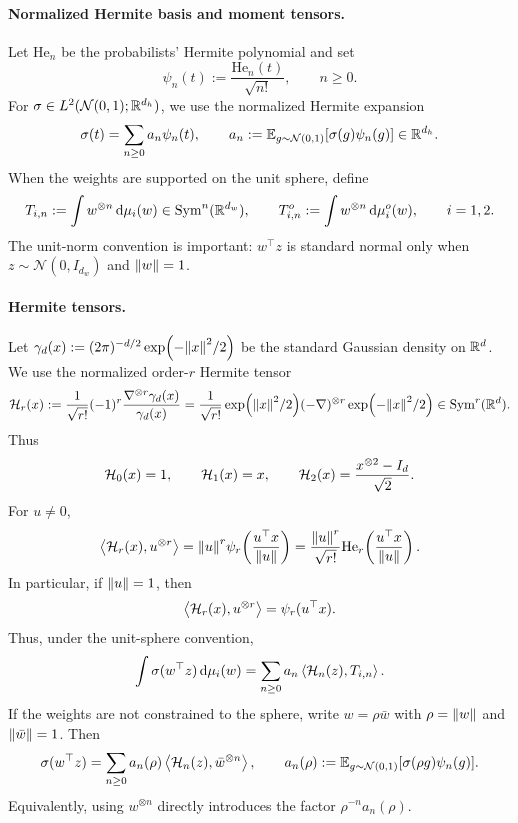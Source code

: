 \paragraph{Normalized Hermite basis and moment tensors.}
Let $\mathrm{He}_n$ be the probabilists' Hermite polynomial and set
\[
    \psi_n(t):=\frac{\mathrm{He}_n(t)}{\sqrt{n!}},
    \qquad n\ge0.
\]
For $\sigma\in L^2(\mathcal N(0,1);\mathbb{R}^{d_h})$, we use the normalized Hermite expansion
\[
    \sigma(t)=\sum_{n\ge0}a_n\psi_n(t),
    \qquad
    a_n:=\mathbb{E}_{g\sim\mathcal N(0,1)}[\sigma(g)\psi_n(g)]\in\mathbb{R}^{d_h}.
\]
When the weights are supported on the unit sphere, define
\[
    T_{i,n}:=\int w^{\otimes n}\,\dd\mu_i(w)
    \in\mathrm{Sym}^n(\mathbb{R}^{d_w}),
    \qquad
    T_{i,n}^o:=\int w^{\otimes n}\,\dd\mu_i^o(w),
    \qquad i=1,2.
\]
The unit-norm convention is important: $w^\top z$ is standard normal only when
$z\sim\mathcal N(0,I_{d_w})$ and $\norm{w}=1$.

\paragraph{Hermite tensors.}
Let $\gamma_d(x):=(2\pi)^{-d/2}\exp(-\norm{x}^2/2)$ be the standard Gaussian density on $\mathbb{R}^d$.
We use the normalized order-$r$ Hermite tensor
\[
\mathcal{H}_r(x)
:=
\frac1{\sqrt{r!}}
(-1)^r\frac{\nabla^{\otimes r}\gamma_d(x)}{\gamma_d(x)}
=
\frac1{\sqrt{r!}}
\exp(\norm{x}^2/2)(-\nabla)^{\otimes r}\exp(-\norm{x}^2/2)
\in\mathrm{Sym}^r(\mathbb{R}^d).
\]
Thus
\[
\mathcal{H}_0(x)=1,
\qquad
\mathcal{H}_1(x)=x,
\qquad
\mathcal{H}_2(x)=\frac{x^{\otimes2}-I_d}{\sqrt2}.
\]
For $u\ne0$,
\begin{equation}
\label{eq:directional-hermite-tensor-normalized}
    \left\langle \mathcal{H}_r(x),u^{\otimes r}\right\rangle
    =
    \norm{u}^r\psi_r\!\left(\frac{u^\top x}{\norm{u}}\right)
    =
    \frac{\norm{u}^r}{\sqrt{r!}}
    \mathrm{He}_r\!\left(\frac{u^\top x}{\norm{u}}\right).
\end{equation}
In particular, if $\norm{u}=1$, then
\[
    \left\langle \mathcal{H}_r(x),u^{\otimes r}\right\rangle=\psi_r(u^\top x).
\]
Thus, under the unit-sphere convention,
\begin{equation}
\label{eq:activation-moment-expansion}
    \int \sigma(w^\top z)\,\dd\mu_i(w)
    =
    \sum_{n\ge0}a_n\left\langle \mathcal{H}_n(z),T_{i,n}\right\rangle.
\end{equation}
If the weights are not constrained to the sphere, write $w=\rho\bar w$ with $\rho=\norm{w}$ and
$\norm{\bar w}=1$.  Then
\[
    \sigma(w^\top z)
    =
    \sum_{n\ge0}a_n(\rho)\left\langle \mathcal{H}_n(z),\bar w^{\otimes n}\right\rangle,
    \qquad
    a_n(\rho):=
    \mathbb{E}_{g\sim\mathcal N(0,1)}[\sigma(\rho g)\psi_n(g)].
\]
Equivalently, using $w^{\otimes n}$ directly introduces the factor $\rho^{-n}a_n(\rho)$.

